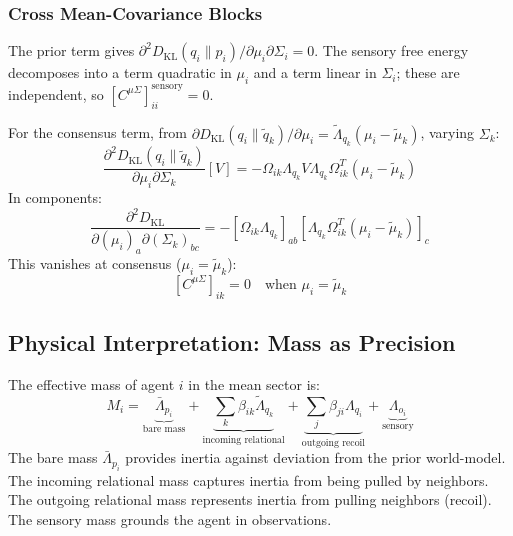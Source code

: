 \documentclass[11pt]{article}
\begin{document}
\subsubsection{Cross Mean-Covariance Blocks}

The prior term gives $\partial^2 D_{\mathrm{KL}}(q_i \| p_i)/\partial \mu_i \partial \Sigma_i = 0$. The sensory free energy decomposes into a term quadratic in $\mu_i$ and a term linear in $\Sigma_i$; these are independent, so $[C^{\mu\Sigma}]_{ii}^{\mathrm{sensory}} = 0$.

For the consensus term, from $\partial D_{\mathrm{KL}}(q_i \| \tilde{q}_k)/\partial \mu_i = \tilde{\Lambda}_{q_k}(\mu_i - \tilde{\mu}_k)$, varying $\Sigma_k$:
\begin{equation}
\frac{\partial^2 D_{\mathrm{KL}}(q_i \| \tilde{q}_k)}{\partial \mu_i \partial \Sigma_k}[V] = -\Omega_{ik}\Lambda_{q_k} V \Lambda_{q_k} \Omega_{ik}^T (\mu_i - \tilde{\mu}_k)
\end{equation}
In components:
\begin{equation}
\frac{\partial^2 D_{\mathrm{KL}}}{\partial(\mu_i)_a \partial(\Sigma_k)_{bc}} = -[\Omega_{ik}\Lambda_{q_k}]_{ab}[\Lambda_{q_k}\Omega_{ik}^T(\mu_i - \tilde{\mu}_k)]_c
\end{equation}
This vanishes at consensus ($\mu_i = \tilde{\mu}_k$):
\begin{equation}
\boxed{[C^{\mu\Sigma}]_{ik} = 0 \quad \text{when } \mu_i = \tilde{\mu}_k}
\label{eq:cross_block}
\end{equation}

\subsection{Physical Interpretation: Mass as Precision}

The effective mass of agent $i$ in the mean sector is:
\begin{equation}
M_i = \underbrace{\bar{\Lambda}_{p_i}}_{\text{bare mass}} + \underbrace{\sum_k \beta_{ik}\tilde{\Lambda}_{q_k}}_{\text{incoming relational}} + \underbrace{\sum_j \beta_{ji}\Lambda_{q_i}}_{\text{outgoing recoil}} + \underbrace{\Lambda_{o_i}}_{\text{sensory}}
\label{eq:effective_mass}
\end{equation}
The bare mass $\bar{\Lambda}_{p_i}$ provides inertia against deviation from the prior world-model. The incoming relational mass captures inertia from being pulled by neighbors. The outgoing relational mass represents inertia from pulling neighbors (recoil). The sensory mass grounds the agent in observations.
\end{document}
